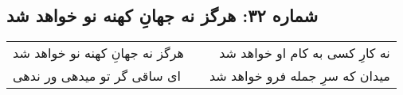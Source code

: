 \begin{center}
\section*{شماره ۳۲: هرگز نه جهانِ کهنه نو خواهد شد}
\label{sec:032}
\begin{longtable}{l p{0.5cm} r}
هرگز نه جهانِ کهنه نو خواهد شد
&&
نه کارِ کسی به کام او خواهد شد
\\
ای ساقی گر تو میدهی ور ندهی
&&
میدان که سرِ جمله فرو خواهد شد
\\
\end{longtable}
\end{center}

